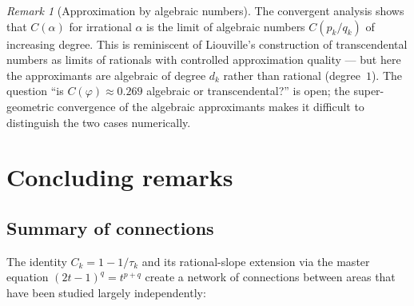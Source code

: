 \documentclass[11pt]{article}
\theoremstyle{definition}
\theoremstyle{remark}
\newtheorem{remark}[theorem]{Remark}
\begin{document}
\begin{remark}[Approximation by algebraic numbers]
The convergent analysis shows that $C(\alpha)$ for irrational
$\alpha$ is the limit of algebraic numbers $C(p_k/q_k)$ of
increasing degree.
This is reminiscent of Liouville's construction of transcendental
numbers as limits of rationals with controlled approximation
quality --- but here the approximants are algebraic of degree
$d_k$ rather than rational (degree~$1$).
The question ``is $C(\varphi) \approx 0.269$ algebraic or
transcendental?'' is open;
the super-geometric convergence of the algebraic approximants
makes it difficult to distinguish the two cases numerically.
\end{remark}

\section{Concluding remarks}\label{sec:outlook}

\subsection{Summary of connections}

The identity $C_k = 1 - 1/\tau_k$ and its rational-slope extension
via the master equation $(2t-1)^q = t^{p+q}$ create a network of
connections between areas that have been studied largely independently:
\end{document}
